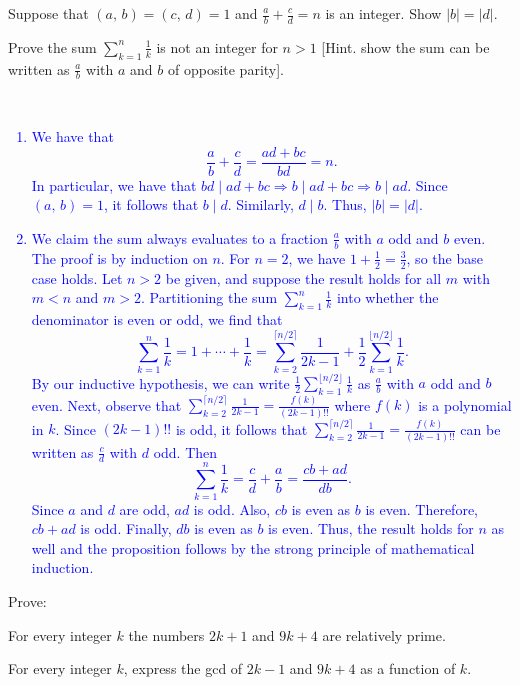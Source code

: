 \documentclass[a4paper,11pt]{article}
\theoremstyle{mythm}
\theoremstyle{mydef}
\newcommand{\blue}[1]{\textcolor{blue}{#1}}
\newcommand{\abs}[1]{\left\vert #1 \right\vert}
\begin{document}
\begin{enumerate*}[{\bf (a)}]
\item Suppose that $(a,\,b) = (c,\,d) = 1$ and $\frac{a}{b}+\frac{c}{d}=n$ is an
  integer. Show $\abs{b}=\abs{d}$.
\item Prove the sum $\sum_{k=1}^n\frac{1}{k}$ is not an integer for $n>1$ [Hint.
  show the sum can be written as $\frac{a}{b}$ with $a$ and $b$ of opposite
  parity].
\end{enumerate*} \\

\blue{
  \begin{enumerate}[{\bf (a)}]
  \item We have that
    \[
      \frac{a}{b}+\frac{c}{d} = \frac{ad+bc}{bd} = n.
    \]
    In particular, we have that $bd \mid ad+bc \Rightarrow b \mid ad+bc
    \Rightarrow b \mid ad$. Since $(a,\,b)=1$, it follows that $b \mid d$.
    Similarly, $d \mid b$. Thus, $\abs{b}=\abs{d}$.
  \item We claim the sum always evaluates to a fraction $\frac{a}{b}$ with $a$
    odd and $b$ even. The proof is by induction on $n$. For $n=2$, we have
    $1+\frac{1}{2} = \frac{3}{2}$, so the base case holds. Let $n>2$ be given,
    and suppose the result holds for all $m$ with $m < n$ and $m > 2$.
    Partitioning the sum $\sum_{k=1}^n\frac{1}{k}$ into whether the denominator
    is even or odd, we find that
    \[
      \sum_{k=1}^n\frac{1}{k} = 1+\cdots+\frac{1}{k} = \sum_{k=2}^{\lceil n/2
        \rceil}\frac{1}{2k-1} + \frac{1}{2}\sum_{k=1}^{\lfloor n/2
        \rfloor}\frac{1}{k}.
    \]
    By our inductive hypothesis, we can write $\frac{1}{2}\sum_{k=1}^{\lfloor
      n/2 \rfloor}\frac{1}{k}$ as $\frac{a}{b}$ with $a$ odd and $b$ even. Next,
    observe that $\sum_{k=2}^{\lceil n/2
      \rceil}\frac{1}{2k-1}=\frac{f(k)}{(2k-1)!!}$ where $f(k)$ is a polynomial
    in $k$. Since $(2k-1)!!$ is odd, it follows that $\sum_{k=2}^{\lceil n/2
      \rceil}\frac{1}{2k-1}=\frac{f(k)}{(2k-1)!!}$ can be written as
    $\frac{c}{d}$ with $d$ odd. Then
    \[
      \sum_{k=1}^n\frac{1}{k} = \frac{c}{d}+\frac{a}{b} = \frac{cb+ad}{db}.
    \]
    Since $a$ and $d$ are odd, $ad$ is odd. Also, $cb$ is even as $b$ is even.
    Therefore, $cb+ad$ is odd. Finally, $db$ is even as $b$ is even. Thus, the
    result holds for $n$ as well and the proposition follows by the strong
    principle of mathematical induction.
\end{enumerate}}

 Prove:
\begin{enumerate*}[{\bf (a)}]
\item For every integer $k$ the numbers $2k+1$ and $9k+4$ are relatively prime.
\item For every integer $k$, express the gcd of $2k-1$ and $9k+4$ as a function
  of $k$.
\end{enumerate*} \\
\end{document}
